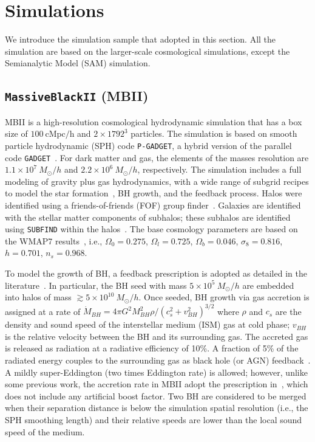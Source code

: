 \documentclass[twocolumn]{aastex631}
\newcommand{\todo}[1]{\textcolor{red}{[{\bf TODO}: #1]}}
\begin{document}
\section{Simulations}
\label{sec:simulations}
We introduce the simulation sample that adopted in this section. All the simulation are based on the larger-scale cosmological simulations, except the Semianalytic Model (SAM) simulation.

\subsection{{\tt MassiveBlackII} (MBII)}
MBII is a high-resolution cosmological hydrodynamic simulation that has a box size of $100~\mathrm{cMpc/h}$ and $2\times1792^3$ particles. The simulation is based on smooth particle hydrodynamic (SPH) code \texttt{P-GADGET}, a hybrid version of the parallel code {\tt GADGET}~\citep{2005MNRAS.364.1105S}. For dark matter and gas, the elements of the masses resolution are $1.1\times 10^7~M_{\odot}/h$ and $2.2\times 10^6~M_{\odot}/h$, respectively. The simulation includes a full modeling of gravity plus gas hydrodynamics, with a wide range of subgrid recipes to model the star formation~\citep{2003MNRAS.339..289S}, BH growth, and the feedback process. Halos were identified using a friends-of-friends (FOF) group finder~\citep{1985ApJ...292..371D}. Galaxies are identified with the stellar matter components of subhalos; these subhalos are identified using {\tt SUBFIND} within the halos~\citep{2005MNRAS.364.1105S}. The base cosmology parameters are based on the WMAP7 results~\citep{2011ApJS..192...18K}, i.e., $\Omega_0=0.275$, $\Omega_l=0.725$, $\Omega_b=0.046$, $\sigma_8=0.816$, $h = 0.701$, $n_s=0.968$.

To model the growth of BH, a feedback prescription is adopted as detailed in the literature~\citep{2005Natur.433..604D, 2005MNRAS.361..776S}. In particular, the BH seed with mass $5\times 10^{5}~M_{\odot}/h$ are embedded into halos of mass $\gtrsim 5\times 10^{10}~M_{\odot}/h$. Once seeded, BH growth via gas accretion is assigned at a rate of $\dot{M}_{BH}={4\pi G^2 M_{BH}^2 \rho}/{(c_s^2+v_{BH}^2)^{3/2}}$ where $\rho$ and $c_s$ are the density and sound speed of the interstellar medium (ISM) gas at cold phase; $v_{BH}$ is the relative velocity between the BH and its surrounding gas. The accreted gas is released as radiation at a radiative efficiency of 10\%. A fraction of 5\% of the radiated energy couples to the surrounding gas as black hole (or AGN) feedback~\citep{2005Natur.433..604D}. A mildly super-Eddington (two times Eddington rate) is allowed; however, unlike some previous work, the accretion rate in MBII adopt the prescription in~\citet{Pelupessy2007}, which does not include any artificial boost factor. Two BH are considered to be merged when their separation distance is below the simulation spatial resolution (i.e., the SPH smoothing length) and their relative speeds are lower than the local sound speed of the medium.
\end{document}
